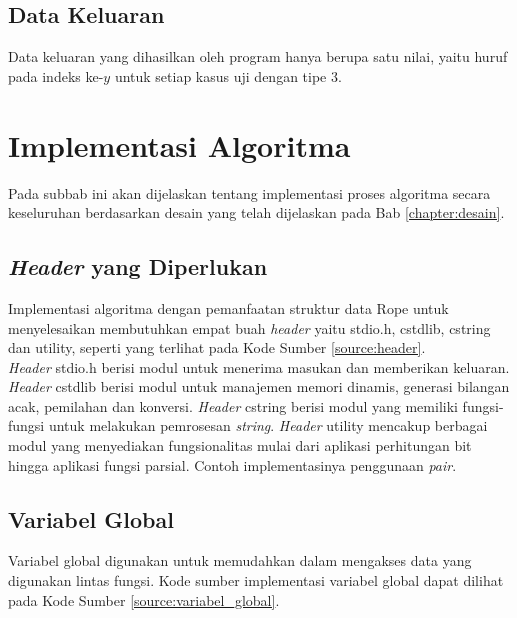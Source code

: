 \subsection{Data Keluaran}
Data keluaran yang dihasilkan oleh program hanya berupa satu nilai, yaitu huruf pada indeks ke-$y$ untuk setiap kasus uji dengan tipe $3$. 

\section{Implementasi Algoritma}
Pada subbab ini akan dijelaskan tentang implementasi proses algoritma secara keseluruhan berdasarkan desain yang telah dijelaskan pada Bab \ref{chapter:desain}.

\subsection{\textit{Header} yang Diperlukan}
Implementasi algoritma dengan pemanfaatan struktur data Rope untuk menyelesaikan \problem{} membutuhkan empat buah \textit{header} yaitu stdio.h, cstdlib, cstring dan utility, seperti yang terlihat pada Kode Sumber \ref{source:header}.\\



\textit{Header} stdio.h berisi modul untuk menerima masukan dan memberikan keluaran. \textit{Header} cstdlib berisi modul untuk manajemen memori dinamis, generasi bilangan acak, pemilahan dan konversi. \textit{Header} cstring berisi modul yang memiliki fungsi-fungsi untuk melakukan pemrosesan \textit{string}. \textit{Header} utility mencakup berbagai modul yang menyediakan fungsionalitas mulai dari aplikasi perhitungan bit hingga aplikasi fungsi parsial. Contoh implementasinya penggunaan \textit{pair}. 

\subsection{Variabel Global}
Variabel global digunakan untuk memudahkan dalam mengakses data yang digunakan lintas fungsi. Kode sumber implementasi variabel global dapat dilihat pada Kode Sumber \ref{source:variabel_global}.

\begin{minipage}{\linewidth}

\end{minipage}
	
